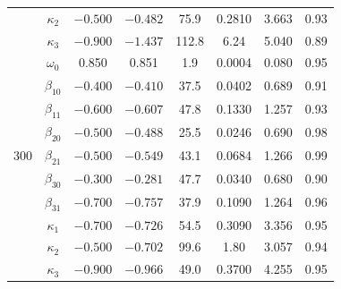 \begin{table}[pos=htbp]
\begin{tabular}{@{}cccccccc@{}}
		 & $\kappa_2$ & $-0.500$ & $-0.482$ & 75.9 & 0.2810 & 3.663 & 0.93 \\
		 & $\kappa_3$ & $-0.900$ & $-1.437$ & 112.8 & 6.24 & 5.040 & 0.89 \\
		\midrule
		 & $\omega_0$ & 0.850 & 0.851 & 1.9 & 0.0004 & 0.080 & 0.95 \\
		 & $\beta_{10}$ & $-0.400$ & $-0.410$ & 37.5 & 0.0402 & 0.689 & 0.91 \\
		 & $\beta_{11}$ & $-0.600$ & $-0.607$ & 47.8 & 0.1330 & 1.257 & 0.93 \\
		 & $\beta_{20}$ & $-0.500$ & $-0.488$ & 25.5 & 0.0246 & 0.690 & 0.98 \\
		300 & $\beta_{21}$ & $-0.500$ & $-0.549$ & 43.1 & 0.0684 & 1.266 & 0.99 \\
		 & $\beta_{30}$ & $-0.300$ & $-0.281$ & 47.7 & 0.0340 & 0.680 & 0.90 \\
		 & $\beta_{31}$ & $-0.700$ & $-0.757$ & 37.9 & 0.1090 & 1.264 & 0.96 \\
		 & $\kappa_1$ & $-0.700$ & $-0.726$ & 54.5 & 0.3090 & 3.356 & 0.95 \\
		 & $\kappa_2$ & $-0.500$ & $-0.702$ & 99.6 & 1.80 & 3.057 & 0.94 \\
		 & $\kappa_3$ & $-0.900$ & $-0.966$ & 49.0 & 0.3700 & 4.255 & 0.95 \\
		\bottomrule
	\end{tabular}
\end{table}

